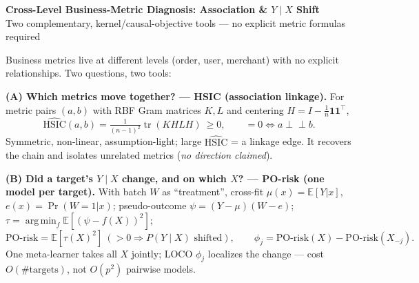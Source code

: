\documentclass[10pt]{article}
\newcommand{\E}{\mathbb{E}}
\newcommand{\HSIC}{\mathrm{HSIC}}
\newcommand{\argmin}{\operatorname*{arg\,min}}
\begin{document}
\begin{center}
{\large\textbf{Cross-Level Business-Metric Diagnosis: Association \& $Y\!\mid\!X$ Shift}}\\[2pt]
{\small Two complementary, kernel/causal-objective tools --- no explicit metric formulas required}
\end{center}
\vspace{-4pt}

Business metrics live at different levels (order, user, merchant) with no
explicit relationships. Two questions, two tools:

\vspace{4pt}
\noindent\textbf{(A) Which metrics move together? --- HSIC (association linkage).}
For metric pairs $(a,b)$ with RBF Gram matrices $K,L$ and centering
$H=I-\tfrac1n\mathbf 1\mathbf 1^\top$,
\[
\widehat{\HSIC}(a,b)=\tfrac{1}{(n-1)^2}\operatorname{tr}(KHLH)\ \ge 0,
\qquad =0 \iff a\perp\!\!\!\perp b .
\]
Symmetric, non-linear, assumption-light; large $\widehat{\HSIC}$ = a linkage
edge. It recovers the chain and isolates unrelated metrics (\emph{no direction
claimed}).

\vspace{3pt}
\noindent\textbf{(B) Did a target's $Y\!\mid\!X$ change, and on which $X$? ---
PO-risk (one model per target).}
With batch $W$ as ``treatment'', cross-fit $\mu(x)=\E[Y|x]$, $e(x)=\Pr(W{=}1|x)$;
pseudo-outcome $\psi=(Y-\mu)(W-e)$; $\tau=\argmin_f\E[(\psi-f(X))^2]$;
\[
\mathrm{PO\text{-}risk}=\E[\tau(X)^2]\ (>0 \Rightarrow P(Y\!\mid\!X)\text{ shifted}),
\qquad
\phi_j=\mathrm{PO\text{-}risk}(X)-\mathrm{PO\text{-}risk}(X_{-j}).
\]
One meta-learner takes all $X$ jointly; LOCO $\phi_j$ localizes the change ---
cost $O(\#\text{targets})$, not $O(p^2)$ pairwise models.
\end{document}
